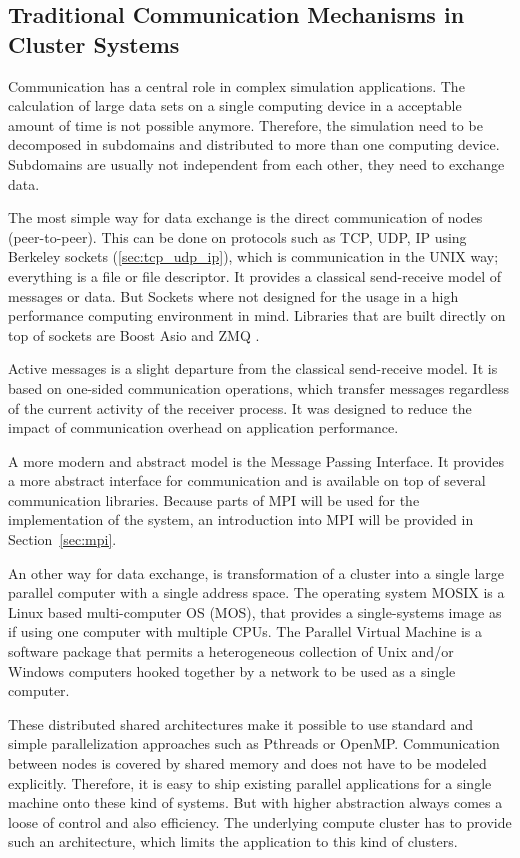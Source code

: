 \subsection{Traditional Communication Mechanisms in Cluster Systems}
\label{sec:communication}
Communication has a central role in complex simulation
applications. The calculation of large data sets on a single computing
device in a acceptable amount of time is not possible anymore.
Therefore, the simulation need to be decomposed in subdomains and
distributed to more than one computing device. Subdomains are usually
not independent from each other, they need to exchange data.

The most simple way for data exchange is the direct communication of
nodes (peer-to-peer).  This can be done on protocols such as TCP, UDP,
IP using Berkeley sockets (\ref{sec:tcp_udp_ip}), which is
communication in the UNIX way; everything is a file or file
descriptor. It provides a classical send-receive model of messages or
data.  But Sockets where not designed for the usage in a high
performance computing environment in mind. Libraries that are built
directly on top of sockets are Boost Asio \cite{ref:boost_asio} and
ZMQ \cite{ref:ZMQ}.

Active messages \cite{ref:am} is a slight departure from the classical
send-receive model. It is based on one-sided communication operations,
which transfer messages regardless of the current activity of the
receiver process. It was designed to reduce the impact of
communication overhead on application performance.

A more modern and abstract model is the Message Passing Interface. It
provides a more abstract interface for communication and is available
on top of several communication libraries. Because parts of MPI will
be used for the implementation of the system, an introduction into MPI
will be provided in Section~\ref{sec:mpi}.

An other way for data exchange, is transformation of a cluster into a
single large parallel computer with a single address space.  The
operating system MOSIX \cite{ref:mosix} is a Linux based
multi-computer OS (MOS), that provides a single-systems
image\cite{ref:single_system_image} as if using one computer with
multiple CPUs. The Parallel Virtual Machine\cite{ref:pvm} is a
software package that permits a heterogeneous collection of Unix
and/or Windows computers hooked together by a network to be used as a
single computer.

These distributed shared architectures make it possible to use
standard and simple parallelization approaches such as Pthreads or
OpenMP.  Communication between nodes is covered by shared memory and
does not have to be modeled explicitly.  Therefore, it is easy to ship
existing parallel applications for a single machine onto these kind of
systems. But with higher abstraction always comes a loose of control
and also efficiency. The underlying compute cluster has to provide
such an architecture, which limits the application to this kind of
clusters.

